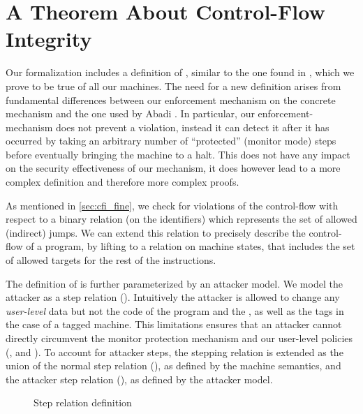 
\section{A Theorem About Control-Flow Integrity}\label{sec:cfi_property}

Our formalization includes a definition of \CFI, similar to the one found in
\cite{abadi2005}, which we prove to be true of all our machines. The need for a
new definition arises from fundamental differences between our enforcement
mechanism on the concrete mechanism and the one used by Abadi \ETAL. In
particular, our enforcement-mechanism does not prevent a violation, instead
it can detect it after it has occurred by taking an arbitrary number of
``protected'' (monitor mode) steps before eventually bringing the machine to a
halt. This does not have any impact on the security effectiveness of our
mechanism, it does however lead to a more complex definition and therefore
more complex proofs.

As mentioned in \ref{sec:cfi_fine}, we check for violations of the control-flow
with respect to a binary relation (on the identifiers) \CFG which represents
the set of allowed (indirect) jumps. We can extend this relation to precisely
describe the control-flow of a program, by lifting \CFG to a relation 
\SUCC on machine states, that includes the set of allowed targets for the rest
of the instructions. 

The definition of \CFI is further parameterized by an attacker model. We
model the attacker as a step relation (\stepa{}{}). Intuitively the attacker is
allowed to change any \emph{user-level} data but not the code of the program and
the \pc, as well as the tags in the case of a tagged machine. 
This limitations ensures that an attacker cannot directly circumvent the monitor
protection mechanism and our user-level policies (\NWC , \NXD and \CFI). To 
account for attacker steps, the stepping relation is extended as the union of 
the normal step relation (\stepn{}{}), as defined by the machine semantics, and
the attacker step relation (\stepa{}{}), as defined by the attacker model.

\begin{figure}[ht]
\centering
\begin{minipage}[b]{0.25\linewidth}
\centering
{}
\label{fig:step_stepn}
\end{minipage}
\hspace{0.5cm}
\begin{minipage}[b]{0.15\linewidth}
\centering
{}
\label{fig:step_stepa}
\end{minipage}
\caption{Step relation definition}
\end{figure}

